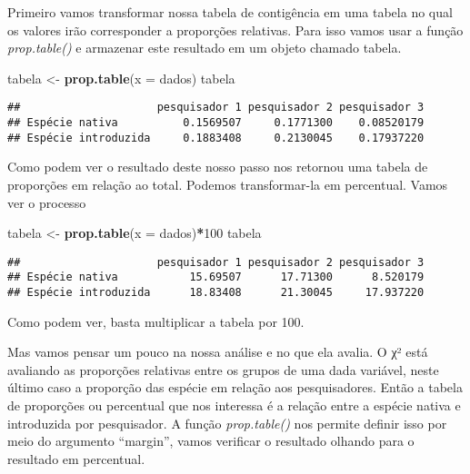 \documentclass[]{book}
\newenvironment{Shaded}{\begin{snugshade}}{\end{snugshade}}
\newcommand{\DataTypeTok}[1]{\textcolor[rgb]{0.13,0.29,0.53}{#1}}
\newcommand{\DecValTok}[1]{\textcolor[rgb]{0.00,0.00,0.81}{#1}}
\newcommand{\KeywordTok}[1]{\textcolor[rgb]{0.13,0.29,0.53}{\textbf{#1}}}
\newcommand{\NormalTok}[1]{#1}
\newcommand{\OperatorTok}[1]{\textcolor[rgb]{0.81,0.36,0.00}{\textbf{#1}}}
\newcommand{\StringTok}[1]{\textcolor[rgb]{0.31,0.60,0.02}{#1}}
\begin{document}
Primeiro vamos transformar nossa tabela de contigência em uma tabela no qual os valores irão corresponder a proporções relativas. Para isso vamos usar a função \emph{prop.table()} e armazenar este resultado em um objeto chamado tabela.

\begin{Shaded}
\begin{Highlighting}[]
\NormalTok{tabela <-}\StringTok{ }\KeywordTok{prop.table}\NormalTok{(}\DataTypeTok{x =}\NormalTok{ dados)}
\NormalTok{tabela}
\end{Highlighting}
\end{Shaded}

\begin{verbatim}
##                     pesquisador 1 pesquisador 2 pesquisador 3
## Espécie nativa          0.1569507     0.1771300    0.08520179
## Espécie introduzida     0.1883408     0.2130045    0.17937220
\end{verbatim}

Como podem ver o resultado deste nosso passo nos retornou uma tabela de proporções em relação ao total. Podemos transformar-la em percentual. Vamos ver o processo

\begin{Shaded}
\begin{Highlighting}[]
\NormalTok{tabela <-}\StringTok{ }\KeywordTok{prop.table}\NormalTok{(}\DataTypeTok{x =}\NormalTok{ dados)}\OperatorTok{*}\DecValTok{100}
\NormalTok{tabela}
\end{Highlighting}
\end{Shaded}

\begin{verbatim}
##                     pesquisador 1 pesquisador 2 pesquisador 3
## Espécie nativa           15.69507      17.71300      8.520179
## Espécie introduzida      18.83408      21.30045     17.937220
\end{verbatim}

Como podem ver, basta multiplicar a tabela por 100.

Mas vamos pensar um pouco na nossa análise e no que ela avalia. O χ² está avaliando as proporções relativas entre os grupos de uma dada variável, neste último caso a proporção das espécie em relação aos pesquisadores. Então a tabela de proporções ou percentual que nos interessa é a relação entre a espécie nativa e introduzida por pesquisador. A função \emph{prop.table()} nos permite definir isso por meio do argumento ``margin'', vamos verificar o resultado olhando para o resultado em percentual.
\end{document}
